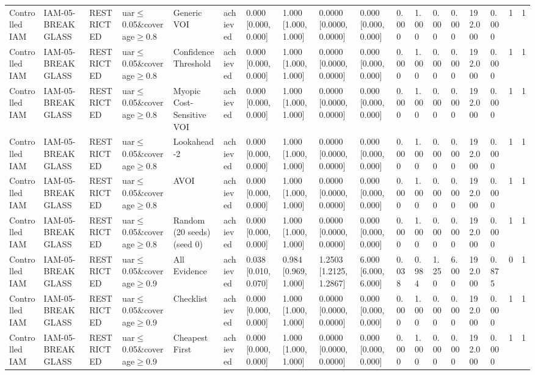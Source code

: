 \begin{table}[!ht]
{\begin{tabular}{llllllllllllllllll}
Controlled IAM & IAM-05-BREAKGLASS & RESTRICTED & uar$\le$0.05\&coverage$\ge$0.8 & Generic VOI & achieved & 0.000 [0.000, 0.000] & 1.000 [1.000, 1.000] & 0.0000 [0.0000, 0.0000] & 0.000 [0.000, 0.000] & 0.000 & 1.000 & 0.000 & 0.000 & 192.000 & 0.000 & 1 & 1 \\
Controlled IAM & IAM-05-BREAKGLASS & RESTRICTED & uar$\le$0.05\&coverage$\ge$0.8 & Confidence Threshold & achieved & 0.000 [0.000, 0.000] & 1.000 [1.000, 1.000] & 0.0000 [0.0000, 0.0000] & 0.000 [0.000, 0.000] & 0.000 & 1.000 & 0.000 & 0.000 & 192.000 & 0.000 & 1 & 1 \\
Controlled IAM & IAM-05-BREAKGLASS & RESTRICTED & uar$\le$0.05\&coverage$\ge$0.8 & Myopic Cost-Sensitive VOI & achieved & 0.000 [0.000, 0.000] & 1.000 [1.000, 1.000] & 0.0000 [0.0000, 0.0000] & 0.000 [0.000, 0.000] & 0.000 & 1.000 & 0.000 & 0.000 & 192.000 & 0.000 & 1 & 1 \\
Controlled IAM & IAM-05-BREAKGLASS & RESTRICTED & uar$\le$0.05\&coverage$\ge$0.8 & Lookahead-2 & achieved & 0.000 [0.000, 0.000] & 1.000 [1.000, 1.000] & 0.0000 [0.0000, 0.0000] & 0.000 [0.000, 0.000] & 0.000 & 1.000 & 0.000 & 0.000 & 192.000 & 0.000 & 1 & 1 \\
Controlled IAM & IAM-05-BREAKGLASS & RESTRICTED & uar$\le$0.05\&coverage$\ge$0.8 & AVOI & achieved & 0.000 [0.000, 0.000] & 1.000 [1.000, 1.000] & 0.0000 [0.0000, 0.0000] & 0.000 [0.000, 0.000] & 0.000 & 1.000 & 0.000 & 0.000 & 192.000 & 0.000 & 1 & 1 \\
Controlled IAM & IAM-05-BREAKGLASS & RESTRICTED & uar$\le$0.05\&coverage$\ge$0.8 & Random (20 seeds) (seed 0) & achieved & 0.000 [0.000, 0.000] & 1.000 [1.000, 1.000] & 0.0000 [0.0000, 0.0000] & 0.000 [0.000, 0.000] & 0.000 & 1.000 & 0.000 & 0.000 & 192.000 & 0.000 & 1 & 1 \\
Controlled IAM & IAM-05-BREAKGLASS & RESTRICTED & uar$\le$0.05\&coverage$\ge$0.9 & All Evidence & achieved & 0.038 [0.010, 0.070] & 0.984 [0.969, 1.000] & 1.2503 [1.2125, 1.2867] & 6.000 [6.000, 6.000] & 0.038 & 0.984 & 1.250 & 6.000 & 192.000 & 0.875 & 0 & 1 \\
Controlled IAM & IAM-05-BREAKGLASS & RESTRICTED & uar$\le$0.05\&coverage$\ge$0.9 & Checklist & achieved & 0.000 [0.000, 0.000] & 1.000 [1.000, 1.000] & 0.0000 [0.0000, 0.0000] & 0.000 [0.000, 0.000] & 0.000 & 1.000 & 0.000 & 0.000 & 192.000 & 0.000 & 1 & 1 \\
Controlled IAM & IAM-05-BREAKGLASS & RESTRICTED & uar$\le$0.05\&coverage$\ge$0.9 & Cheapest First & achieved & 0.000 [0.000, 0.000] & 1.000 [1.000, 1.000] & 0.0000 [0.0000, 0.0000] & 0.000 [0.000, 0.000] & 0.000 & 1.000 & 0.000 & 0.000 & 192.000 & 0.000 & 1 & 1 \\

\end{tabular}}
\end{table}
